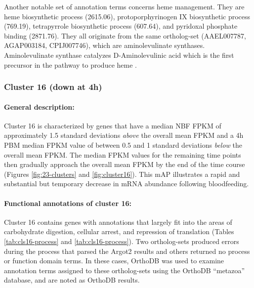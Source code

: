 Another notable set of annotation terms concerns heme management.
%
They are heme biosynthetic process (2615.06), protoporphyrinogen IX biosynthetic process (769.19), tetrapyrrole biosynthetic process (607.64), and pyridoxal phosphate binding (2871.76).
%
They all originate from the same ortholog-set (AAEL007787, AGAP003184, CPIJ007746), which are aminolevulinate synthases.
%
Aminolevulinate synthase catalyzes D-Aminolevulinic acid which is the first precursor in the pathway to produce heme \cite{Layer2010}.








\subsubsection{Cluster 16 (down at 4h)}

\paragraph*{General description:}

Cluster 16 is characterized by genes that have a median \gls{NBF} \gls{FPKM} of approximately 1.5 standard deviations \textit{above} the overall mean \gls{FPKM} and a 4h \gls{PBM} median \gls{FPKM} value of between 0.5 and 1 standard deviations \textit{below} the overall mean \gls{FPKM}. The median \gls{FPKM} values for the remaining time points then gradually approach the overall mean \gls{FPKM} by the end of the time course (Figures \ref{fig:23-clusters} and \ref{fig:cluster16}).
%
This \gls{mAP} illustrates a rapid and substantial but temporary decrease in mRNA abundance following bloodfeeding.
%



\paragraph*{Functional annotations of cluster 16:}


Cluster 16 contains genes with annotations that largely fit into the areas of carbohydrate digestion, cellular arrest, and repression of translation (Tables \ref{tab:cls16-process} and \ref{tab:cls16-process}).
%
Two ortholog-sets produced errors during the process that parsed the \gls{Argot2} results and others returned no process or function domain terms.
%
In these cases, OrthoDB was used to examine annotation terms assigned to these ortholog-sets using the OrthoDB ``metazoa'' database, and are noted as OrthoDB results.

